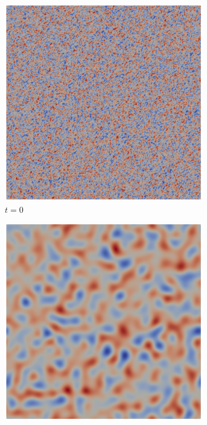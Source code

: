 \begin{figure}[htb]
    \centering
    \begin{subfigure}[t]{0.45\textwidth}
        \centering
        \includegraphics[width=0.95\textwidth]{Imagenes/Maxwell2D/Maxwell2D_sim/Imagenes/t_0}
        \caption{$t=0$}
    \end{subfigure}
    \begin{subfigure}[t]{0.45\textwidth}
        \centering
        \includegraphics[width=0.95\textwidth]{Imagenes/Maxwell2D/Maxwell2D_sim/Imagenes/t_50}

\end{subfigure}
\end{figure}
